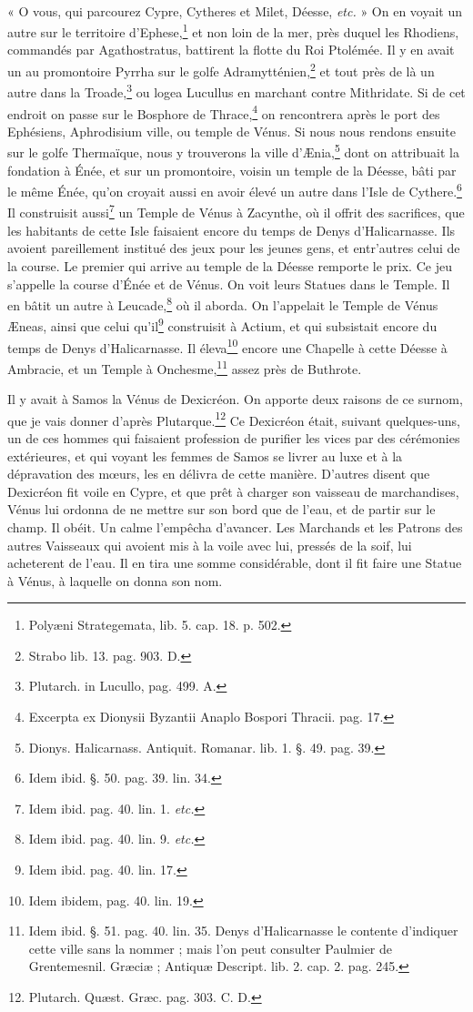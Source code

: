 \documentclass[a4paper, 11pt, oneside, polutonikogreek, french]{article}
\begin{document}
\paragraph{}
« O vous, qui parcourez Cypre, Cytheres et Milet, Déesse, \emph{etc.} » On en voyait un autre sur le territoire d'Ephese,\footnote{Polyæni Strategemata, lib. 5. cap. 18. p. 502.} et non loin de la mer, près duquel les Rhodiens, commandés par Agathostratus, battirent la flotte du Roi Ptolémée. Il y en avait un au promontoire Pyrrha sur le golfe Adramytténien,\footnote{Strabo lib. 13. pag. 903. D.} et tout près de là un autre dans la Troade,\footnote{Plutarch. in Lucullo, pag. 499. A.} ou logea Lucullus en marchant contre Mithridate. Si de cet endroit on passe sur le Bosphore de Thrace,\footnote{Excerpta ex Dionysii Byzantii Anaplo Bospori Thracii. pag. 17.} on rencontrera après le port des Ephésiens, Aphrodisium ville, ou temple de Vénus. Si nous nous rendons ensuite sur le golfe Thermaïque, nous y trouverons la ville d'Ænia,\footnote{Dionys. Halicarnass. Antiquit. Romanar. lib. 1. §. 49. pag. 39.} dont on attribuait la fondation à Énée, et sur un promontoire, voisin un temple de la Déesse, bâti par le même Énée, qu'on croyait aussi en avoir élevé un autre dans l'Isle de Cythere.\footnote{Idem ibid. §. 50. pag. 39. lin. 34.} Il construisit aussi\footnote{Idem ibid. pag. 40. lin. 1. \emph{etc.}} un Temple de Vénus à Zacynthe, où il offrit des sacrifices, que les habitants de cette Isle faisaient encore du temps de Denys d'Halicarnasse. Ils avoient pareillement institué des jeux pour les jeunes gens, et entr'autres celui de la course. Le premier qui arrive au temple de la Déesse remporte le prix. Ce jeu s'appelle la course d'Énée et de Vénus. On voit leurs Statues dans le Temple. Il en bâtit un autre à Leucade,\footnote{Idem ibid. pag. 40. lin. 9. \emph{etc.}} où il aborda. On l'appelait le Temple de Vénus Æneas, ainsi que celui qu'il\footnote{Idem ibid. pag. 40. lin. 17.} construisit à Actium, et qui subsistait encore du temps de Denys d'Halicarnasse. Il éleva\footnote{Idem ibidem, pag. 40. lin. 19.} encore une Chapelle à cette Déesse à Ambracie, et un Temple à Onchesme,\footnote{Idem ibid. §. 51. pag. 40. lin. 35. Denys d'Halicarnasse le contente d'indiquer cette ville sans la nommer ; mais l'on peut consulter Paulmier de Grentemesnil. Græciæ ; Antiquæ Descript. lib. 2. cap. 2. pag. 245.} assez près de Buthrote.

Il y avait à Samos la Vénus de Dexicréon. On apporte deux raisons de ce surnom, que je vais donner d'après Plutarque.\footnote{Plutarch. Quæst. Græc. pag. 303. C. D.} Ce Dexicréon était, suivant quelques-uns, un de ces hommes qui faisaient profession de purifier les vices par des cérémonies extérieures, et qui voyant les femmes de Samos se livrer au luxe et à la dépravation des mœurs, les en délivra de cette manière. D'autres disent que Dexicréon fit voile en Cypre, et que prêt à charger son vaisseau de marchandises, Vénus lui ordonna de ne mettre sur son bord que de l'eau, et de partir sur le champ. Il obéit. Un calme l'empêcha d'avancer. Les Marchands et les Patrons des autres Vaisseaux qui avoient mis à la voile avec lui, pressés de la soif, lui acheterent de l'eau. Il en tira une somme considérable, dont il fit faire une Statue à Vénus, à laquelle on donna son nom.
\end{document}
